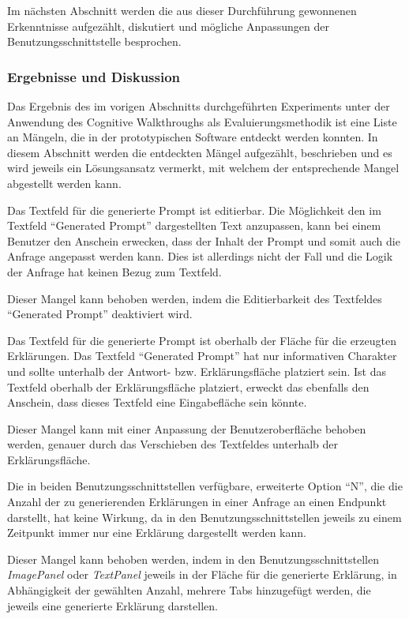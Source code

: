 Im nächsten Abschnitt werden die aus dieser Durchführung gewonnenen Erkenntnisse aufgezählt, diskutiert und mögliche Anpassungen der Benutzungsschnittstelle besprochen.

\subsubsection{Ergebnisse und Diskussion}
\label{sec5:eval:subsubsec:exp-2:results-discussion}
Das Ergebnis des im vorigen Abschnitts durchgeführten Experiments unter der Anwendung des Cognitive Walkthroughs als Evaluierungsmethodik ist eine Liste an Mängeln, die in der prototypischen Software entdeckt werden konnten.
In diesem Abschnitt werden die entdeckten Mängel aufgezählt, beschrieben und es wird jeweils ein Lösungsansatz vermerkt, mit welchem der entsprechende Mangel abgestellt werden kann.

Das Textfeld für die generierte Prompt ist editierbar.
Die Möglichkeit den im Textfeld \enquote{Generated Prompt} dargestellten Text anzupassen, kann bei einem Benutzer den Anschein erwecken, dass der Inhalt der Prompt und somit auch die Anfrage angepasst werden kann.
Dies ist allerdings nicht der Fall und die Logik der Anfrage hat keinen Bezug zum Textfeld.

Dieser Mangel kann behoben werden, indem die Editierbarkeit des Textfeldes \enquote{Generated Prompt} deaktiviert wird.

Das Textfeld für die generierte Prompt ist oberhalb der Fläche für die erzeugten Erklärungen.
Das Textfeld \enquote{Generated Prompt} hat nur informativen Charakter und sollte unterhalb der Antwort- bzw. Erklärungsfläche platziert sein.
Ist das Textfeld oberhalb der Erklärungsfläche platziert, erweckt das ebenfalls den Anschein, dass dieses Textfeld eine Eingabefläche sein könnte.

Dieser Mangel kann mit einer Anpassung der Benutzeroberfläche behoben werden, genauer durch das Verschieben des Textfeldes unterhalb der Erklärungsfläche.

Die in beiden Benutzungsschnittstellen verfügbare, erweiterte Option \enquote{N}, die die Anzahl der zu generierenden Erklärungen in einer Anfrage an einen Endpunkt darstellt, hat keine Wirkung, da in den Benutzungsschnittstellen jeweils zu einem Zeitpunkt immer nur eine Erklärung dargestellt werden kann.

Dieser Mangel kann behoben werden, indem in den Benutzungsschnittstellen \textit{ImagePanel} oder \textit{TextPanel} jeweils in der Fläche für die generierte Erklärung, in Abhängigkeit der gewählten Anzahl, mehrere Tabs hinzugefügt werden, die jeweils eine generierte Erklärung darstellen.

